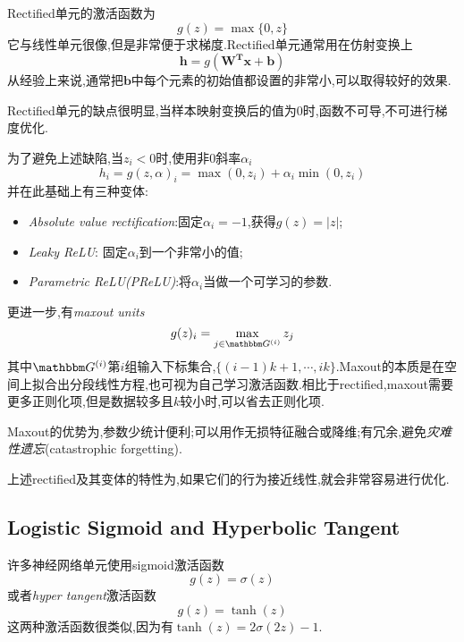 Rectified单元的激活函数为
\begin{equation}
g(z)=\max\{0,z\}
\end{equation}
它与线性单元很像,但是非常便于求梯度.Rectified单元通常用在仿射变换上
\begin{equation}
\bm h=g(\bm{W^Tx+b})
\end{equation}
从经验上来说,通常把$\bm b$中每个元素的初始值都设置的非常小,可以取得较好的效果.

Rectified单元的缺点很明显,当样本映射变换后的值为$0$时,函数不可导,不可进行梯度优化.

为了避免上述缺陷,当$z_i<0$时,使用非$0$斜率$\alpha_i$
\begin{equation}
h_i=g(z,\alpha)_i=\max(0,z_i)+\alpha_i\min(0,z_i)
\end{equation}
并在此基础上有三种变体:
\begin{itemize}
\item \textit{Absolute value rectification}:固定$\alpha_i=-1$,获得$g(z)=|z|$;
\item \textit{Leaky ReLU}: 固定$\alpha_i$到一个非常小的值;
\item \textit{Parametric ReLU(PReLU)}:将$\alpha_i$当做一个可学习的参数.
\end{itemize}

更进一步,有\textit{maxout units}
\begin{equation}
g(z)_i=\max_{j\in\mathbbm G^{(i)}}z_j
\end{equation}
其中$\mathbbm G^{(i)}$第$i$组输入下标集合,$\{(i-1)k+1,\cdots,ik\}$.Maxout的本质是在空间上拟合出分段线性方程,也可视为自己学习激活函数.相比于rectified,maxout需要更多正则化项,但是数据较多且$k$较小时,可以省去正则化项.

Maxout的优势为,参数少统计便利;可以用作无损特征融合或降维;有冗余,避免\textit{灾难性遗忘}(catastrophic forgetting).

上述rectified及其变体的特性为,如果它们的行为接近线性,就会非常容易进行优化.

\subsection{Logistic Sigmoid and Hyperbolic Tangent}

许多神经网络单元使用sigmoid激活函数
\begin{equation}
g(z)=\sigma(z)
\end{equation}
或者\textit{hyper tangent}激活函数
\begin{equation}
g(z)=\tanh(z)
\end{equation}
这两种激活函数很类似,因为有$\tanh(z)=2\sigma(2z)-1$.

